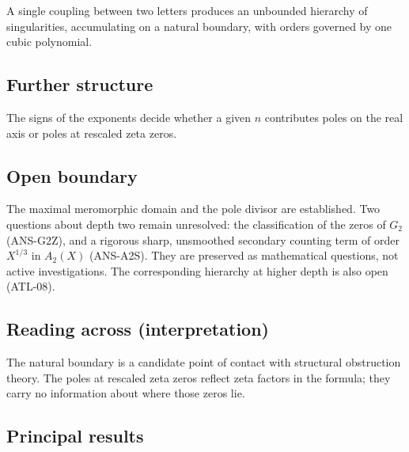\documentclass[
  11pt,
]{article}
\begin{document}
A single coupling between two letters produces an unbounded hierarchy of
singularities, accumulating on a natural boundary, with orders governed
by one cubic polynomial.

\hypertarget{further-structure-6}{%
\subsection{Further structure}\label{further-structure-6}}

The signs of the exponents decide whether a given \(n\) contributes
poles on the real axis or poles at rescaled zeta zeros.

\hypertarget{open-boundary-6}{%
\subsection{Open boundary}\label{open-boundary-6}}

The maximal meromorphic domain and the pole divisor are established. Two
questions about depth two remain unresolved: the classification of the
zeros of \(G_2\) (ANS-G2Z), and a rigorous sharp, unsmoothed secondary
counting term of order \(X^{1/3}\) in \(A_2(X)\) (ANS-A2S). They are
preserved as mathematical questions, not active investigations. The
corresponding hierarchy at higher depth is also open (ATL-08).

\hypertarget{reading-across-interpretation-6}{%
\subsection{Reading across
(interpretation)}\label{reading-across-interpretation-6}}

The natural boundary is a candidate point of contact with structural
obstruction theory. The poles at rescaled zeta zeros reflect zeta
factors in the formula; they carry no information about where those
zeros lie.

\hypertarget{principal-results-6}{%
\subsection{Principal results}\label{principal-results-6}}
\end{document}
